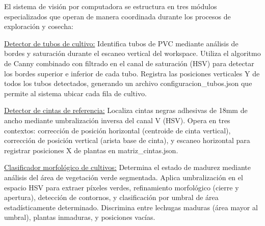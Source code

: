 El sistema de visión por computadora se estructura en tres módulos especializados que operan de manera coordinada durante los procesos de exploración y cosecha:

\underline{Detector de tubos de cultivo:} Identifica tubos de PVC mediante análisis de bordes y saturación durante el escaneo vertical del workspace. Utiliza el algoritmo de Canny combinado con filtrado en el canal de saturación (HSV) para detectar los bordes superior e inferior de cada tubo. Registra las posiciones verticales Y de todos los tubos detectados, generando un archivo configuracion\_tubos.json que permite al sistema ubicar cada fila de cultivo.

\underline{Detector de cintas de referencia:} Localiza cintas negras adhesivas de 18mm de ancho mediante umbralización inversa del canal V (HSV). Opera en tres contextos: corrección de posición horizontal (centroide de cinta vertical), corrección de posición vertical (arista base de cinta), y escaneo horizontal para registrar posiciones X de plantas en matriz\_cintas.json.

\underline{Clasificador morfológico de cultivos:} Determina el estado de madurez mediante análisis del área de vegetación verde segmentada. Aplica umbralización en el espacio HSV para extraer píxeles verdes, refinamiento morfológico (cierre y apertura), detección de contornos, y clasificación por umbral de área estadísticamente determinado. Discrimina entre lechugas maduras (área mayor al umbral), plantas inmaduras, y posiciones vacías.
